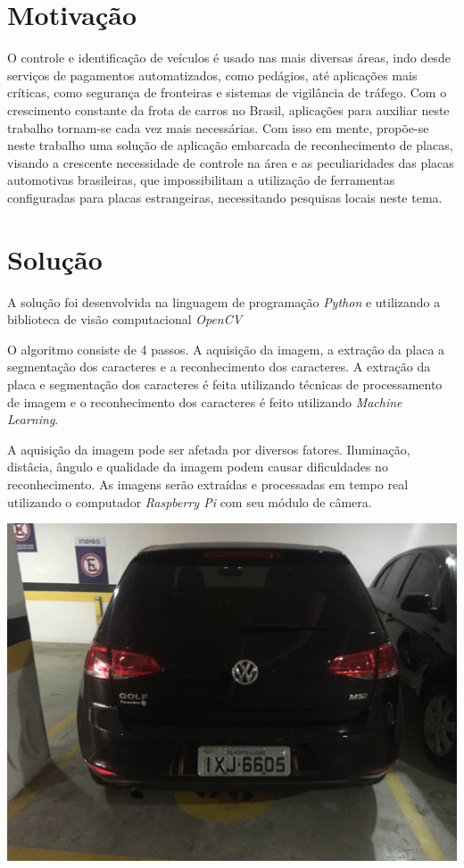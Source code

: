 \documentclass[a0,portrait]{a0poster}
\begin{document}
\begin{multicols}{2}
\color{NavyBlue}
\section*{\huge Motivação}
\color{Black}
\Large
\justifying

O controle e identificação de veículos é usado nas mais diversas áreas, indo
desde serviços de pagamentos automatizados, como pedágios, até aplicações
mais críticas, como segurança de fronteiras e sistemas de vigilância de
tráfego. Com o crescimento constante da frota de carros no Brasil,
aplicações para auxiliar neste trabalho tornam-se cada vez mais necessárias.
Com isso em mente, propõe-se neste trabalho uma solução de aplicação
embarcada de reconhecimento de placas, visando a crescente necessidade de
controle na área e as peculiaridades das placas automotivas brasileiras, que
impossibilitam a utilização de ferramentas configuradas para placas
estrangeiras, necessitando pesquisas locais neste tema.

\color{NavyBlue}
\section*{\huge Solução}
\color{Black}

A solução foi desenvolvida na linguagem de programação \emph{Python} e utilizando
a biblioteca de visão computacional \emph{OpenCV}

O algoritmo consiste de 4 passos. A aquisição da imagem, a extração da 
placa a segmentação dos caracteres e a reconhecimento dos caracteres.
A extração da placa e segmentação dos caracteres é feita utilizando técnicas de
processamento de imagem e o reconhecimento dos caracteres é feito utilizando
\emph{Machine Learning}.

A aquisição da imagem pode ser afetada por diversos fatores. Iluminação, distâcia,
ângulo e qualidade da imagem podem causar dificuldades no reconhecimento. As imagens
serão extraídas e processadas em tempo real utilizando o computador \emph{Raspberry Pi}
com seu módulo de câmera.

\begin{center}
	\includegraphics[width=0.70\linewidth]{../../input/full_car.JPG}
	\label{fig:input_image}
\end{center}


\end{multicols}
\end{document}
